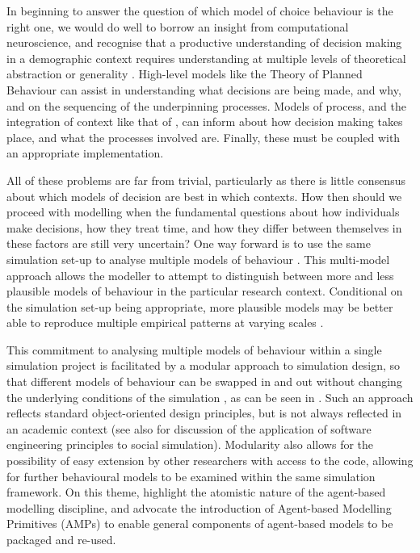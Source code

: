 \documentclass{article}
\begin{document}
In beginning to answer the question of which model of choice behaviour is the right one, we would do well to borrow an insight from computational neuroscience, and recognise that a productive understanding of decision making in a demographic context requires understanding at multiple levels of theoretical abstraction or generality \citep{Marr1976,Marr1982}. High-level models like the Theory of Planned Behaviour \citep{Ajzen1991} can assist in understanding what decisions are being made, and why, and on the sequencing of the underpinning processes. Models of process, and the integration of context like that of \citet{Ben-Akiva2012}, can inform about how decision making takes place, and what the processes involved are. Finally, these must be coupled with an appropriate implementation. 

All of these problems are far from trivial, particularly as there is little consensus about which models of decision are best in which contexts. How then should we proceed with modelling when the fundamental questions about how individuals make decisions, how they treat time, and how they differ between themselves in these factors are still very uncertain? One way forward is to use the same simulation set-up to analyse multiple models of behaviour \citep{Grimm2005, Epstein2013, Rossiter2014}. This multi-model approach allows the modeller to attempt to distinguish between more and less plausible models of behaviour in the particular research context. Conditional on the simulation set-up being appropriate, more plausible models may be better able to reproduce multiple empirical patterns at varying scales \citep{Werker2004, Bianchi2008}.

This commitment to analysing multiple models of behaviour within a single simulation project is facilitated by a modular approach to simulation design, so that different models of behaviour can be swapped in and out without changing the underlying conditions of the simulation \citep{Epstein2013}, as can be seen in \citet{Gray2016}. Such an approach reflects standard object-oriented design principles, but is not always reflected in an academic context (see also \citet{Rossiter2015} for discussion of the application of software engineering principles to social simulation). Modularity also allows for the possibility of easy extension by other researchers with access to the code, allowing for further behavioural models to be examined within the same simulation framework. On this theme, \cite{Bell2015} highlight the atomistic nature of the agent-based modelling discipline, and advocate the introduction of Agent-based Modelling Primitives (AMPs) to enable general components of agent-based models to be packaged and re-used. 
\end{document}
